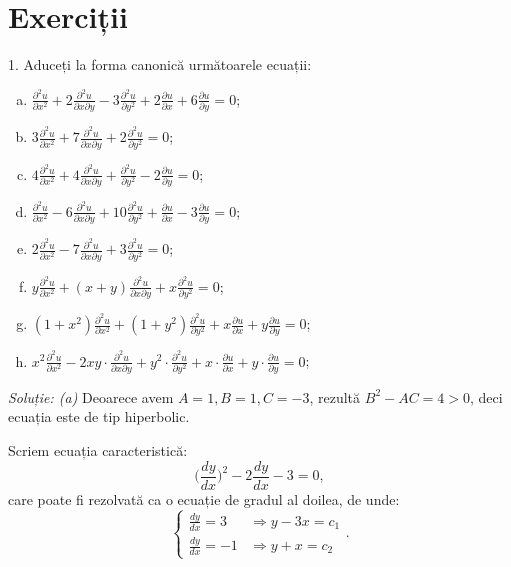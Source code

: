 \documentclass[11pt,a4paper]{article}
\theoremstyle{dotless}
\theoremstyle{dotlessdr}
\begin{document}
\section{Exerciții}

1. Aduceți la forma canonică următoarele ecuații:
\begin{enumerate}[(a)]
\item $ \frac{\partial^2 u}{\partial x^2} + 2 \frac{\partial^2 u}{\partial x \partial y} - %
  3 \frac{\partial^2 u}{\partial y^2} + 2 \frac{\partial u}{\partial x} + %
  6 \frac{\partial u}{\partial y} = 0 $;
\item $ 3 \frac{\partial^2 u}{\partial x^2} + 7 \frac{\partial^2 u}{\partial x\partial y} + %
  2 \frac{\partial^2 u}{\partial y^2} = 0 $;
\item $ 4 \frac{\partial^2 u}{\partial x^2} + 4 \frac{\partial^2 u}{\partial x \partial y} + %
  \frac{\partial^2 u}{\partial y^2} - 2 \frac{\partial u}{\partial y} = 0 $;
\item $ \frac{\partial^2 u}{\partial x^2} - 6 \frac{\partial^2 u}{\partial x\partial y} + %
  10 \frac{\partial^2 u}{\partial y^2} + \frac{\partial u}{\partial x} - %
  3 \frac{\partial u}{\partial y} = 0 $;
\item $ 2 \frac{\partial^2 u}{\partial x^2} - 7 \frac{\partial^2 u}{\partial x \partial y} + %
  3 \frac{\partial^2 u}{\partial y^2} = 0 $;
\item $ y \frac{\partial^2 u}{\partial x^2} + (x + y) \frac{\partial^2 u}{\partial x \partial y} + %
  x \frac{\partial^2 u}{\partial y^2} = 0 $;
\item $ (1 + x^2) \frac{\partial^2 u}{\partial x^2} + %
  (1 + y^2) \frac{\partial^2 u}{\partial y^2} + %
  x \frac{\partial u}{\partial x} + y \frac{\partial u}{\partial y} = 0 $;
\item $ x^2 \frac{\partial^2 u}{\partial x^2} - %
  2xy \cdot \frac{\partial^2 u}{\partial x \partial y} + %
  y^2 \cdot \frac{\partial^2 u}{\partial y^2} + %
  x \cdot \frac{\partial u}{\partial x} + y \cdot \frac{\partial u}{\partial y} = 0 $;
\end{enumerate}

\emph{Soluție: (a)} Deoarece avem $ A = 1, B = 1, C = -3 $, rezultă $ B^2 - AC = 4 > 0 $,
deci ecuația este de tip hiperbolic.

Scriem ecuația caracteristică:
\[
  \Big( \frac{dy}{dx} \Big)^2 - 2 \frac{dy}{dx} - 3 = 0,
\]
care poate fi rezolvată ca o ecuație de gradul al doilea, de unde:
\[
  \begin{cases}
    \frac{dy}{dx} = 3 &\Rightarrow y - 3x = c_1 \\
    \frac{dy}{dx} = -1 &\Rightarrow y + x = c_2
  \end{cases}.
\]
\end{document}
